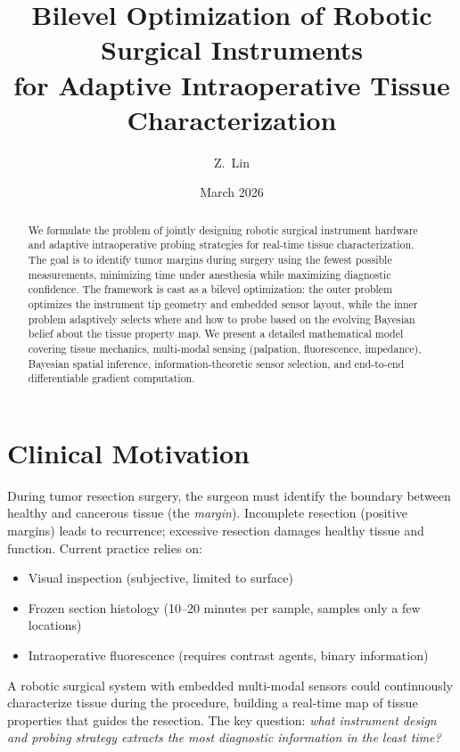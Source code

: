 \documentclass[11pt,a4paper]{article}
\title{Bilevel Optimization of Robotic Surgical Instruments\\for Adaptive Intraoperative Tissue Characterization}
\author{Z.\ Lin}
\date{March 2026}
\theoremstyle{definition}
\begin{document}
\maketitle

\begin{abstract}
We formulate the problem of jointly designing robotic surgical instrument hardware and adaptive intraoperative probing strategies for real-time tissue characterization.  The goal is to identify tumor margins during surgery using the fewest possible measurements, minimizing time under anesthesia while maximizing diagnostic confidence.  The framework is cast as a bilevel optimization: the outer problem optimizes the instrument tip geometry and embedded sensor layout, while the inner problem adaptively selects where and how to probe based on the evolving Bayesian belief about the tissue property map.  We present a detailed mathematical model covering tissue mechanics, multi-modal sensing (palpation, fluorescence, impedance), Bayesian spatial inference, information-theoretic sensor selection, and end-to-end differentiable gradient computation.
\end{abstract}

\tableofcontents
\newpage

\section{Clinical Motivation}

During tumor resection surgery, the surgeon must identify the boundary between healthy and cancerous tissue (the \emph{margin}).  Incomplete resection (positive margins) leads to recurrence; excessive resection damages healthy tissue and function.  Current practice relies on:
\begin{itemize}[nosep]
  \item Visual inspection (subjective, limited to surface)
  \item Frozen section histology (10--20 minutes per sample, samples only a few locations)
  \item Intraoperative fluorescence (requires contrast agents, binary information)
\end{itemize}

A robotic surgical system with embedded multi-modal sensors could continuously characterize tissue during the procedure, building a real-time map of tissue properties that guides the resection.  The key question: \emph{what instrument design and probing strategy extracts the most diagnostic information in the least time?}
\end{document}
